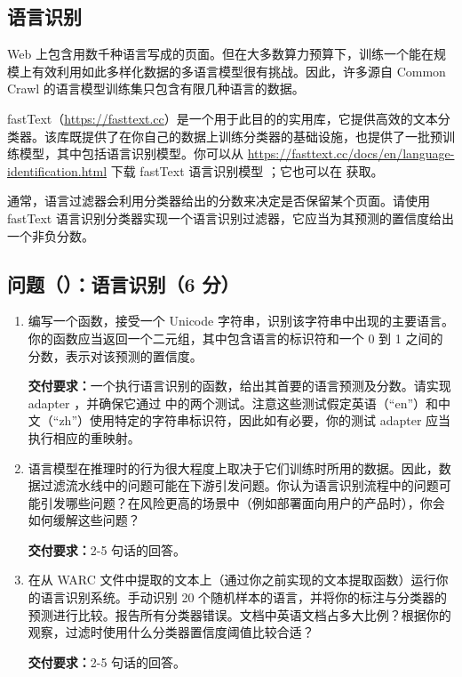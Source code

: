 \subsection{语言识别}

Web 上包含用数千种语言写成的页面。但在大多数算力预算下，训练一个能在规模上有效利用如此多样化数据的多语言模型很有挑战。因此，许多源自 Common Crawl 的语言模型训练集只包含有限几种语言的数据。

fastText（\url{https://fasttext.cc}）是一个用于此目的的实用库，它提供高效的文本分类器。该库既提供了在你自己的数据上训练分类器的基础设施，也提供了一批预训练模型，其中包括语言识别模型。你可以从 \url{https://fasttext.cc/docs/en/language-identification.html} 下载 fastText 语言识别模型 ；它也可以在  获取。

通常，语言过滤器会利用分类器给出的分数来决定是否保留某个页面。请使用 fastText 语言识别分类器实现一个语言识别过滤器，它应当为其预测的置信度给出一个非负分数。

\subsection*{问题（）：语言识别（6 分）}

\begin{enumerate}[label=(\alph*)]
  \item 编写一个函数，接受一个 Unicode 字符串，识别该字符串中出现的主要语言。你的函数应当返回一个二元组，其中包含语言的标识符和一个 0 到 1 之间的分数，表示对该预测的置信度。

  \textbf{交付要求：}一个执行语言识别的函数，给出其首要的语言预测及分数。请实现 adapter ，并确保它通过  中的两个测试。注意这些测试假定英语（“en”）和中文（“zh”）使用特定的字符串标识符，因此如有必要，你的测试 adapter 应当执行相应的重映射。

  \item 语言模型在推理时的行为很大程度上取决于它们训练时所用的数据。因此，数据过滤流水线中的问题可能在下游引发问题。你认为语言识别流程中的问题可能引发哪些问题？在风险更高的场景中（例如部署面向用户的产品时），你会如何缓解这些问题？

  \textbf{交付要求：}2-5 句话的回答。

  \item 在从 WARC 文件中提取的文本上（通过你之前实现的文本提取函数）运行你的语言识别系统。手动识别 20 个随机样本的语言，并将你的标注与分类器的预测进行比较。报告所有分类器错误。文档中英语文档占多大比例？根据你的观察，过滤时使用什么分类器置信度阈值比较合适？

  \textbf{交付要求：}2-5 句话的回答。
\end{enumerate}

